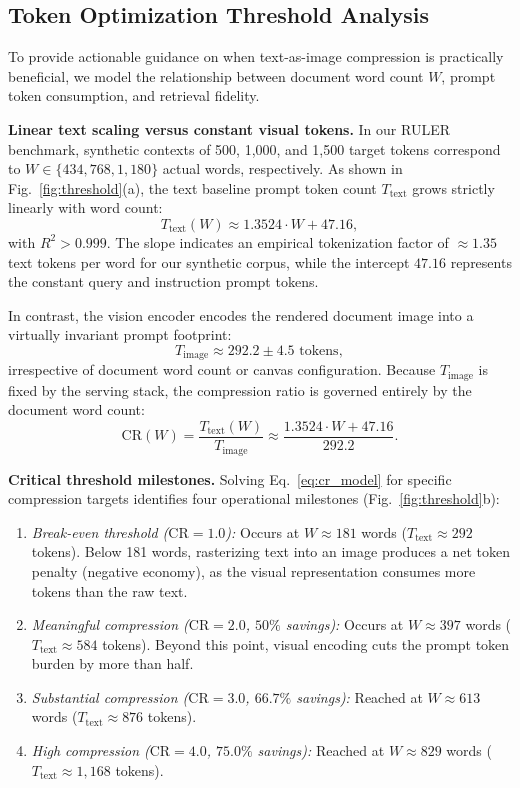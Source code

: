 \documentclass[conference]{IEEEtran}
\begin{document}
\subsection{Token Optimization Threshold Analysis}
\label{sec:threshold}
To provide actionable guidance on when text-as-image compression is practically beneficial, we model the relationship between document word count $W$, prompt token consumption, and retrieval fidelity.

\textbf{Linear text scaling versus constant visual tokens.}
In our RULER benchmark, synthetic contexts of 500, 1{,}000, and 1{,}500 target tokens correspond to $W \in \{434, 768, 1{,}180\}$ actual words, respectively. As shown in Fig.~\ref{fig:threshold}(a), the text baseline prompt token count $T_{\text{text}}$ grows strictly linearly with word count:
\begin{equation}
T_{\text{text}}(W) \approx 1.3524 \cdot W + 47.16,
\label{eq:text_scaling}
\end{equation}
with $R^2 > 0.999$. The slope indicates an empirical tokenization factor of $\approx 1.35$ text tokens per word for our synthetic corpus, while the intercept $47.16$ represents the constant query and instruction prompt tokens.

In contrast, the vision encoder encodes the rendered document image into a virtually invariant prompt footprint:
\begin{equation}
T_{\text{image}} \approx 292.2 \pm 4.5\text{ tokens},
\label{eq:img_constant}
\end{equation}
irrespective of document word count or canvas configuration. Because $T_{\text{image}}$ is fixed by the serving stack, the compression ratio is governed entirely by the document word count:
\begin{equation}
\mathrm{CR}(W) = \frac{T_{\text{text}}(W)}{T_{\text{image}}} \approx \frac{1.3524 \cdot W + 47.16}{292.2}.
\label{eq:cr_model}
\end{equation}

\textbf{Critical threshold milestones.}
Solving Eq.~\eqref{eq:cr_model} for specific compression targets identifies four operational milestones (Fig.~\ref{fig:threshold}b):
\begin{enumerate}
\item \emph{Break-even threshold ($\mathrm{CR} = 1.0$):} Occurs at $W \approx 181$ words ($T_{\text{text}} \approx 292$ tokens). Below 181 words, rasterizing text into an image produces a net token penalty (negative economy), as the visual representation consumes more tokens than the raw text.
\item \emph{Meaningful compression ($\mathrm{CR} = 2.0$, $50\%$ savings):} Occurs at $W \approx 397$ words ($T_{\text{text}} \approx 584$ tokens). Beyond this point, visual encoding cuts the prompt token burden by more than half.
\item \emph{Substantial compression ($\mathrm{CR} = 3.0$, $66.7\%$ savings):} Reached at $W \approx 613$ words ($T_{\text{text}} \approx 876$ tokens).
\item \emph{High compression ($\mathrm{CR} = 4.0$, $75.0\%$ savings):} Reached at $W \approx 829$ words ($T_{\text{text}} \approx 1{,}168$ tokens).
\end{enumerate}
\end{document}
